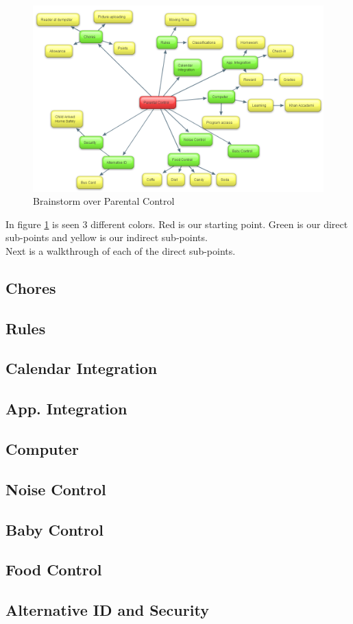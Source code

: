 \begin{figure}[htbp]
	\centering
		\includegraphics[width=1.00\textwidth]{images/BrainStorm.png}
	\caption{Brainstorm over Parental Control}
	\label{fig:BrainStorm}
\end{figure}

In figure \ref{fig:BrainStorm} is seen 3 different colors. Red is our starting point. Green is our direct sub-points and yellow is our indirect sub-points.\\
Next is a walkthrough of each of the direct sub-points.\\
\subsection{Chores}
\subsection{Rules}
\subsection{Calendar Integration}
\subsection{App. Integration}
\subsection{Computer}
\subsection{Noise Control}
\subsection{Baby Control}
\subsection{Food Control}
\subsection{Alternative ID and Security}


